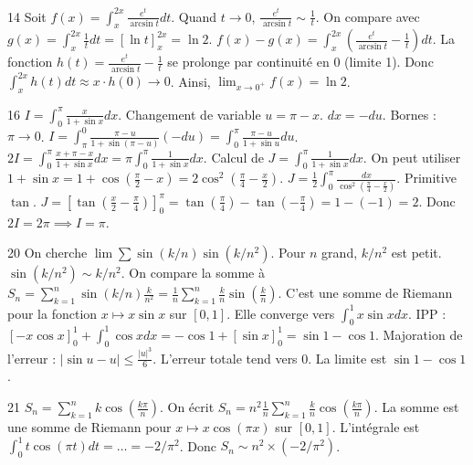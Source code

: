 \begin{correction}{14}
Soit $f(x) = \int_x^{2x} \frac{e^t}{\arcsin t} dt$.
Quand $t \to 0$, $\frac{e^t}{\arcsin t} \sim \frac{1}{t}$.
On compare avec $g(x) = \int_x^{2x} \frac{1}{t} dt = [\ln t]_x^{2x} = \ln 2$.
$f(x) - g(x) = \int_x^{2x} (\frac{e^t}{\arcsin t} - \frac{1}{t}) dt$.
La fonction $h(t) = \frac{e^t}{\arcsin t} - \frac{1}{t}$ se prolonge par continuité en 0 (limite 1).
Donc $\int_x^{2x} h(t) dt \approx x \cdot h(0) \to 0$.
Ainsi, $\lim_{x\to 0^+} f(x) = \ln 2$.
\end{correction}

\begin{correction}{16}
$I = \int_0^\pi \frac{x}{1+\sin x} dx$.
Changement de variable $u = \pi - x$. $dx = -du$.
Bornes : $\pi \to 0$.
$I = \int_\pi^0 \frac{\pi-u}{1+\sin(\pi-u)} (-du) = \int_0^\pi \frac{\pi-u}{1+\sin u} du$.
$2I = \int_0^\pi \frac{x + \pi - x}{1+\sin x} dx = \pi \int_0^\pi \frac{1}{1+\sin x} dx$.
Calcul de $J = \int_0^\pi \frac{1}{1+\sin x} dx$.
On peut utiliser $1+\sin x = 1 + \cos(\frac{\pi}{2}-x) = 2 \cos^2(\frac{\pi}{4}-\frac{x}{2})$.
$J = \frac{1}{2} \int_0^\pi \frac{dx}{\cos^2(\frac{\pi}{4}-\frac{x}{2})}$. Primitive $\tan$.
$J = [\tan(\frac{x}{2}-\frac{\pi}{4})]_0^\pi = \tan(\frac{\pi}{4}) - \tan(-\frac{\pi}{4}) = 1 - (-1) = 2$.
Donc $2I = 2\pi \implies I = \pi$.
\end{correction}

\begin{correction}{20}
On cherche $\lim \sum \sin(k/n) \sin(k/n^2)$.
Pour $n$ grand, $k/n^2$ est petit. $\sin(k/n^2) \sim k/n^2$.
On compare la somme à $S_n = \sum_{k=1}^n \sin(k/n) \frac{k}{n^2} = \frac{1}{n} \sum_{k=1}^n \frac{k}{n} \sin(\frac{k}{n})$.
C'est une somme de Riemann pour la fonction $x \mapsto x \sin x$ sur $[0,1]$.
Elle converge vers $\int_0^1 x \sin x dx$.
IPP : $[-x\cos x]_0^1 + \int_0^1 \cos x dx = -\cos 1 + [\sin x]_0^1 = \sin 1 - \cos 1$.
Majoration de l'erreur : $|\sin u - u| \le \frac{|u|^3}{6}$.
L'erreur totale tend vers 0. La limite est $\sin 1 - \cos 1$.
\end{correction}

\begin{correction}{21}
$S_n = \sum_{k=1}^n k \cos(\frac{k\pi}{n})$.
On écrit $S_n = n^2 \frac{1}{n} \sum_{k=1}^n \frac{k}{n} \cos(\frac{k\pi}{n})$.
La somme est une somme de Riemann pour $x \mapsto x \cos(\pi x)$ sur $[0,1]$.
L'intégrale est $\int_0^1 t \cos(\pi t) dt = \dots = -2/\pi^2$.
Donc $S_n \sim n^2 \times (-2/\pi^2)$.
\end{correction}

